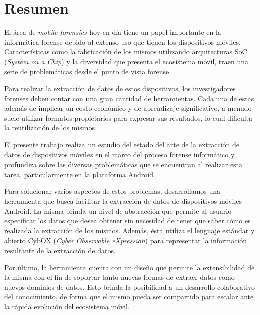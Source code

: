 \chapter*{Resumen}
El área de \emph{mobile forensics} hoy en día tiene un papel importante en la informática forense debido al extenso uso que tienen los dispositivos móviles. Características como la fabricación de los mismos utilizando arquitecturas SoC (\emph{System on a Chip}) y la diversidad que presenta el ecosistema móvil, traen una serie de problemáticas desde el punto de vista forense.

Para realizar la extracción de datos de estos dispositivos, los investigadores forenses deben contar con una gran cantidad de herramientas. Cada una de estas, además de implicar un costo económico y de aprendizaje significativo, a menudo suele utilizar formatos propietarios para expresar sus resultados, lo cual dificulta la reutilización de los mismos.

El presente trabajo realiza un estudio del estado del arte de la extracción de datos de dispositivos móviles en el marco del proceso forense informático y profundiza sobre las diversas problemáticas que se encuentran al realizar esta tarea, particularmente en la plataforma Android.

Para solucionar varios aspectos de estos problemas, desarrollamos una herramienta que busca facilitar la extracción de datos de dispositivos móviles Android. La misma brinda un nivel de abstracción que permite al usuario especificar los datos que desea obtener sin necesidad de tener que saber cómo es realizada la extracción de los mismos. Además, ésta utiliza el lenguaje estándar y abierto CybOX (\emph{Cyber Observable eXpression}) para representar la información resultante de la extracción de datos.

Por último, la herramienta cuenta con un diseño que permite la extensibilidad de la misma con el fin de soportar tanto nuevas formas de extraer datos como nuevos dominios de datos. Esto brinda la posibilidad a un desarrollo colaborativo del conocimiento, de forma que el mismo pueda ser compartido para escalar ante la rápida evolución del ecosistema móvil.